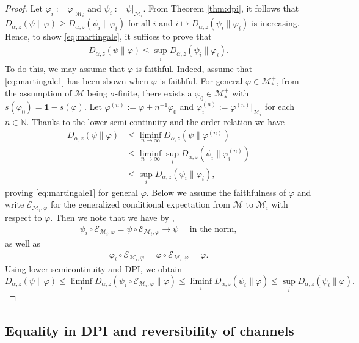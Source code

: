 \documentclass[12pt]{article}
\theoremstyle{definition}
\theoremstyle{remark}
\numberwithin{equation}{section}
\def\cE{\mathcal E}
\def\cM{\mathcal M}
\def\ffi{\varphi}
\def\1{\mathbf{1}}
\def\bN{\mathbb{N}}
\begin{document}
\begin{proof}
Let $\ffi_i:=\ffi|_{\cM_i}$ and $\psi_i:=\psi|_{\cM_i}$. From Theorem
\ref{thm:dpi}, it
follows that $D_{\alpha,z}(\psi\|\ffi)\ge D_{\alpha,z}(\psi_i\|\ffi_i)$ for all $i$ and
$i\mapsto D_{\alpha,z}(\psi_i\|\ffi_i)$ is increasing. Hence, to show \eqref{eq:martingale}, it suffices to prove that
\begin{align}\label{eq:martingale1}
D_{\alpha,z}(\psi\|\ffi)\le\sup_iD_{\alpha,z}(\psi_i\|\ffi_i).
\end{align}
To do this, we may assume that $\ffi$ is faithful. Indeed, assume that
\eqref{eq:martingale1} has been sbown when $\ffi$ is
faithful. For general $\ffi\in\cM_*^+$, from the assumption of $\cM$ being $\sigma$-finite, there exists a
$\ffi_0\in\cM_*^+$ with $s(\ffi_0)=\1-s(\ffi)$. Let $\ffi^{(n)}:=\ffi+n^{-1}\ffi_0$ and $\ffi_i^{(n)}:=\ffi^{(n)}|_{\cM_i}$
for each $n\in\bN$. Thanks to the lower semi-continuity \cite[Theorem 1(iv) and Theorem
2(iv)]{kato2023onrenyi} and the order
relation \cite[Theorem 1(iii) and Theorem 2(iii)]{kato2023onrenyi} we have
\begin{align*}
D_{\alpha,z}(\psi\|\ffi)&\le\liminf_{n\to\infty}D_{\alpha,z}(\psi\|\ffi^{(n)}) \\
&\le\liminf_{n\to\infty}\sup_iD_{\alpha,z}(\psi_i\|\ffi_i^{(n)}) \\
&\le\sup_iD_{\alpha,z}(\psi_i\|\ffi_i),
\end{align*}
proving \eqref{eq:martingale1} for general $\ffi$. Below we assume the faithfulness of $\ffi$ and write $\cE_{\cM_i,\ffi}$
for the generalized conditional expectation from $\cM$ to $\cM_i$ with respect to $\ffi$. 
Then we note that we have by \cite[Theorem 3]{hiai1984strong},  
\begin{align}\label{eq:martingaleHT}
\psi_i\circ\cE_{\cM_i,\ffi}=\psi\circ\cE_{\cM_i,\ffi}\to\psi\quad\mbox{ in the norm},
\end{align}
as well as
\begin{align}\label{eq:condexp}
\ffi_i\circ\cE_{\cM_i,\ffi}=\ffi\circ\cE_{\cM_i,\ffi}=\ffi.
\end{align}
Using lower semicontinuity and DPI, we obtain
\[
D_{\alpha,z}(\psi\|\ffi)\le \liminf_{i}
D_{\alpha,z}(\psi_i\circ\cE_{\cM_i,\varphi}\|\ffi)\le \liminf_i
D_{\alpha,z}(\psi_i\|\varphi)\le \sup_i D_{\alpha,z}(\psi_i\|\ffi).
\]
\end{proof}


\subsection{Equality in DPI and reversibility of channels}
\end{document}
